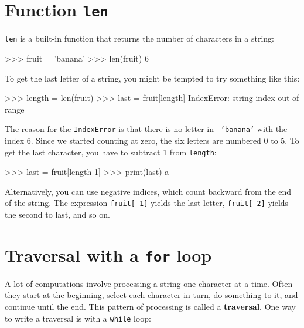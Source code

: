 \section{Function {\tt len}}


{\tt len} is a built-in function that returns the number of characters
in a string:

\beforeverb
\begin{pyinterpreter}
>>> fruit = 'banana'
>>> len(fruit)
6
\end{pyinterpreter}
\afterverb
%
To get the last letter of a string, you might be tempted to try something
like this:


\beforeverb
\begin{pyinterpreter}
>>> length = len(fruit)
>>> last = fruit[length]
IndexError: string index out of range
\end{pyinterpreter}
\afterverb
%
The reason for the {\tt IndexError} is that there is no letter in {\tt
'banana'} with the index 6.  Since we started counting at zero, the
six letters are numbered 0 to 5.  To get the last character, you have
to subtract 1 from {\tt length}:

\beforeverb
\begin{pyinterpreter}
>>> last = fruit[length-1]
>>> print(last)
a
\end{pyinterpreter}
\afterverb
%
Alternatively, you can use negative indices, which count backward from
the end of the string.  The expression {\tt fruit[-1]} yields the last
letter, {\tt fruit[-2]} yields the second to last, and so on.



\section{Traversal with a {\tt for} loop}
\label{for}


A lot of computations involve processing a string one character at a
time.  Often they start at the beginning, select each character in
turn, do something to it, and continue until the end.  This pattern of
processing is called a {\bf traversal}.  One way to write a traversal
is with a {\tt while} loop:

